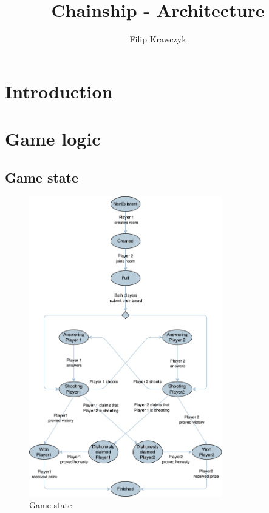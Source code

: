 \documentclass{article}
\begin{document}
    \title{Chainship - Architecture}
    \author{Filip Krawczyk}
    \maketitle

    \section{Introduction}

    

    \section{Game logic}

    \subsection{Game state}

    \begin{figure}[H]
        \centering
        \includegraphics[width=0.75\textwidth]{state.png}
        \caption{Game state}
        \label{fig:game_state}
    \end{figure}
\end{document}
